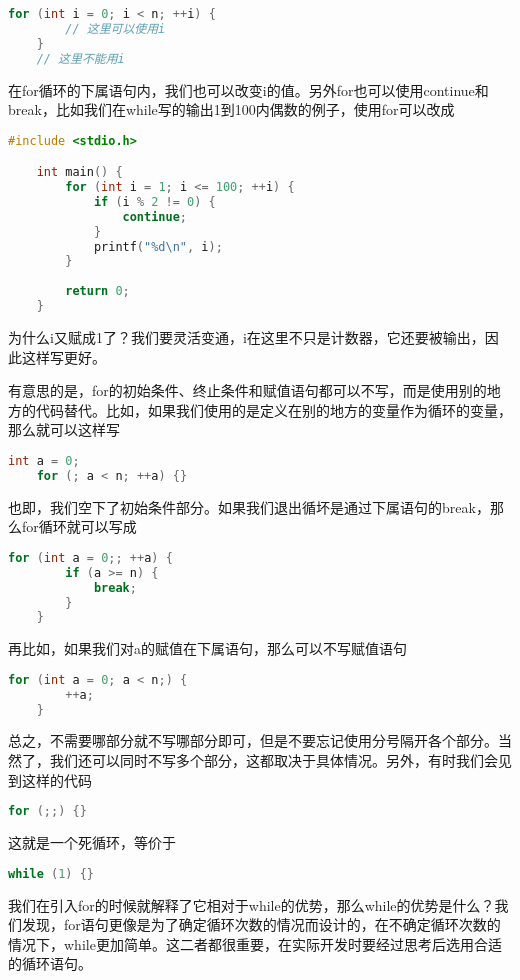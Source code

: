 \begin{lstlisting}[language=C]
    for (int i = 0; i < n; ++i) {
        // 这里可以使用i
    }
    // 这里不能用i
\end{lstlisting}

在for循环的下属语句内，我们也可以改变i的值。另外for也可以使用continue和break，比如我们在while写的输出1到100内偶数的例子，使用for可以改成

\begin{lstlisting}[language=C]
    #include <stdio.h>

    int main() {
        for (int i = 1; i <= 100; ++i) {
            if (i % 2 != 0) {
                continue;
            }
            printf("%d\n", i);
        }
        
        return 0;
    }
\end{lstlisting}

为什么i又赋成1了？我们要灵活变通，i在这里不只是计数器，它还要被输出，因此这样写更好。

有意思的是，for的初始条件、终止条件和赋值语句都可以不写，而是使用别的地方的代码替代。比如，如果我们使用的是定义在别的地方的变量作为循环的变量，那么就可以这样写

\begin{lstlisting}[language=C]
    int a = 0;
    for (; a < n; ++a) {}
\end{lstlisting}

也即，我们空下了初始条件部分。如果我们退出循坏是通过下属语句的break，那么for循环就可以写成

\begin{lstlisting}[language=C]
    for (int a = 0;; ++a) {
        if (a >= n) {
            break;
        }
    }
\end{lstlisting}

再比如，如果我们对a的赋值在下属语句，那么可以不写赋值语句

\begin{lstlisting}[language=C]
    for (int a = 0; a < n;) {
        ++a;
    }
\end{lstlisting}

总之，不需要哪部分就不写哪部分即可，但是不要忘记使用分号隔开各个部分。当然了，我们还可以同时不写多个部分，这都取决于具体情况。另外，有时我们会见到这样的代码

\begin{lstlisting}[language=C]
    for (;;) {}
\end{lstlisting}

这就是一个死循环，等价于

\begin{lstlisting}[language=C]
    while (1) {}
\end{lstlisting}

我们在引入for的时候就解释了它相对于while的优势，那么while的优势是什么？我们发现，for语句更像是为了确定循环次数的情况而设计的，在不确定循环次数的情况下，while更加简单。这二者都很重要，在实际开发时要经过思考后选用合适的循环语句。
